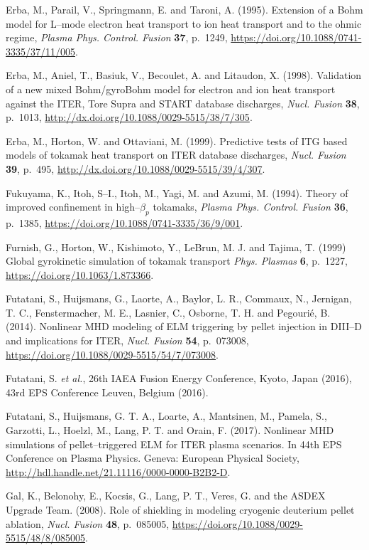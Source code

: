 \documentclass[a4paper,openany,12pt]{book}
\begin{document}
{\begin{thebibliography}{100}
\bibitem{}
Erba, M., Parail, V., Springmann, E. and Taroni, A. (1995). Extension of a Bohm model for L--mode electron heat transport to ion heat transport and to the ohmic regime, \emph{Plasma Phys. Control. Fusion} \textbf{37}, 
p.~1249, \url{https://doi.org/10.1088/0741-3335/37/11/005}.

\bibitem{}
Erba, M., Aniel, T., Basiuk, V., Becoulet, A. and Litaudon, X. (1998). Validation of a new mixed Bohm/gyroBohm model for electron and ion heat transport against the ITER, Tore Supra and START database discharges, \emph{Nucl. Fusion} \textbf{38}, p.~1013, \url{http://dx.doi.org/10.1088/0029-5515/38/7/305}.

\bibitem{}
Erba, M., Horton, W. and Ottaviani, M. (1999). Predictive tests of ITG based models of tokamak heat transport on ITER database discharges, \emph{Nucl. Fusion} \textbf{39}, p.~495, \url{http://dx.doi.org/10.1088/0029-5515/39/4/307}.

\bibitem{}
Fukuyama, K., Itoh, S--I., Itoh, M., Yagi, M. and Azumi, M. (1994). Theory of improved confinement in 
high--$\beta_p$ tokamaks, \emph{Plasma Phys. Control. Fusion} \textbf{36}, p.~1385, 
\url{https://doi.org/10.1088/0741-3335/36/9/001}.

\bibitem{}
Furnish, G., Horton, W., Kishimoto, Y., LeBrun, M. J. and Tajima, T. (1999) Global gyrokinetic simulation of tokamak transport \emph{Phys. Plasmas} \textbf{6}, p.~1227, \url{https://doi.org/10.1063/1.873366}.

\bibitem{}
Futatani, S., Huijsmans, G., Laorte, A., Baylor, L. R., Commaux, N., Jernigan, T. C., Fenstermacher, M. E., Lasnier, C., Osborne, T. H. and Pegouri\'e, B. (2014). Nonlinear MHD modeling of ELM triggering by pellet injection in DIII--D and implications for ITER, \emph{Nucl. Fusion} \textbf{54}, p.~073008, 
\url{https://doi.org/10.1088/0029-5515/54/7/073008}.

\bibitem{}
Futatani, S. \emph{et al.}, 26th IAEA Fusion Energy Conference, Kyoto, Japan (2016), 43rd EPS Conference Leuven, Belgium (2016).

\bibitem{}
Futatani, S., Huijsmans, G. T. A., Loarte, A., Mantsinen, M., Pamela, S., Garzotti, L., Hoelzl, M., Lang, P. T. and Orain, F. (2017). Nonlinear MHD simulations of pellet--triggered ELM for ITER plasma scenarios. In 44th EPS Conference on Plasma Physics. Geneva: European Physical Society, \url{http://hdl.handle.net/21.11116/0000-0000-B2B2-D}.

\bibitem{}
Gal, K., Belonohy, E., Kocsis, G., Lang, P. T., Veres, G. and the ASDEX Upgrade Team. (2008). Role of shielding in modeling cryogenic deuterium pellet ablation, \emph{Nucl. Fusion} \textbf{48}, p.~085005, \url{https://doi.org/10.1088/0029-5515/48/8/085005}.


\end{thebibliography}}
\end{document}
